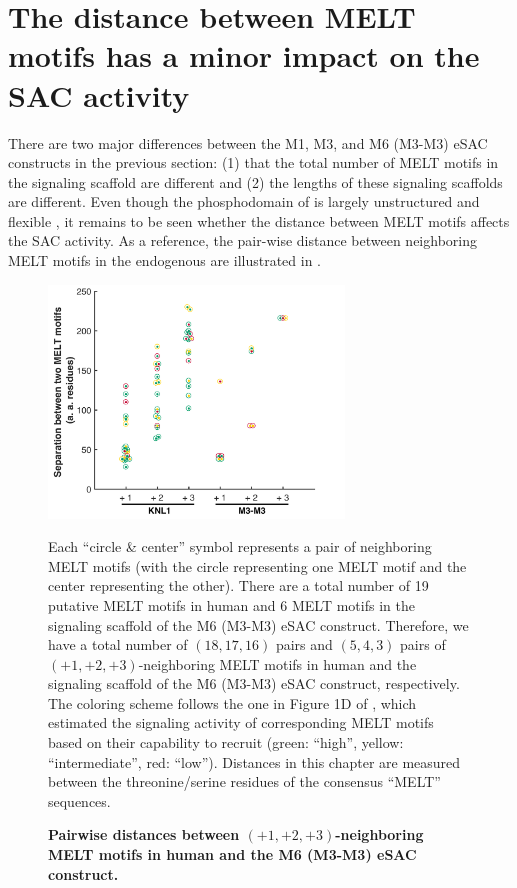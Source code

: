 \section{The distance between MELT motifs has a minor impact on the SAC activity}

There are two major differences between the M1, M3, and M6 (M3-M3) eSAC constructs in the previous section: (1) that the total number of MELT motifs in the signaling scaffold are different and (2) the lengths of these signaling scaffolds are different. Even though the phosphodomain of  is largely unstructured and flexible \cite{UnstructuredKNL1}, it remains to be seen whether the distance between MELT motifs affects the SAC activity. As a reference, the pair-wise distance between neighboring MELT motifs in the endogenous  are illustrated in .

\begin{figure}
    \centering
    \includegraphics[width=0.7\textwidth]{chapters/figures/MELTSeparationColorCodedBeeSwarmPlot.pdf}
    \caption{\textbf{Pairwise distances between $(+1, +2, +3)$-neighboring MELT motifs in human  and the M6 (M3-M3) eSAC construct.}}
    \noindent\justifying Each ``circle \& center'' symbol represents a pair of neighboring MELT motifs (with the circle representing one MELT motif and the center representing the other). There are a total number of 19 putative MELT motifs in human  and 6 MELT motifs in the signaling scaffold of the M6 (M3-M3) eSAC construct. Therefore, we have a total number of $(18, 17, 16)$ pairs and $(5, 4, 3)$ pairs of $(+1, +2, +3)$-neighboring MELT motifs in human  and the signaling scaffold of the M6 (M3-M3) eSAC construct, respectively. The coloring scheme follows the one in Figure 1D of \cite{MELTActivity}, which estimated the signaling activity of corresponding MELT motifs based on their capability to recruit  (green: ``high'', yellow: ``intermediate'', red: ``low''). Distances in this chapter are measured between the threonine/serine residues of the consensus ``MELT'' sequences.
    \label{PairwiseDistancesBetweenNeighboringMELTs}
\end{figure}

